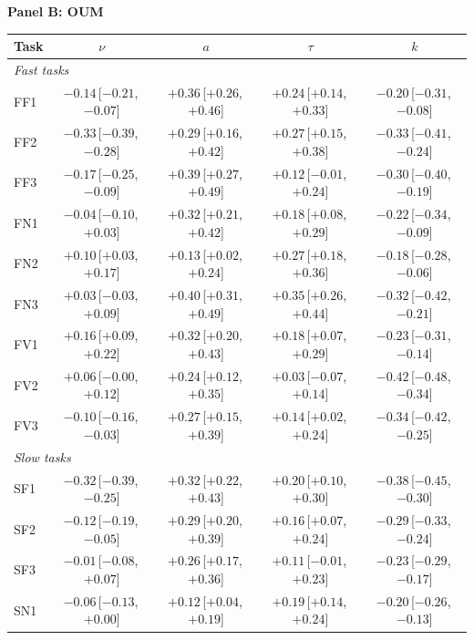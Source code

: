 \begin{table}[ht]
\medskip
\textbf{Panel B: OUM}\par\vspace{2pt}
\begin{tabular}{l cccc}
\toprule
Task & $\nu$ & $a$ & $\tau$ & $k$ \\
\midrule
\multicolumn{5}{l}{\textit{Fast tasks}} \\
FF1 & $-0.14$\,[$-0.21$,\,$-0.07$] & $+0.36$\,[$+0.26$,\,$+0.46$] & $+0.24$\,[$+0.14$,\,$+0.33$] & $-0.20$\,[$-0.31$,\,$-0.08$] \\
FF2 & $-0.33$\,[$-0.39$,\,$-0.28$] & $+0.29$\,[$+0.16$,\,$+0.42$] & $+0.27$\,[$+0.15$,\,$+0.38$] & $-0.33$\,[$-0.41$,\,$-0.24$] \\
FF3 & $-0.17$\,[$-0.25$,\,$-0.09$] & $+0.39$\,[$+0.27$,\,$+0.49$] & $+0.12$\,[$-0.01$,\,$+0.24$] & $-0.30$\,[$-0.40$,\,$-0.19$] \\
FN1 & $-0.04$\,[$-0.10$,\,$+0.03$] & $+0.32$\,[$+0.21$,\,$+0.42$] & $+0.18$\,[$+0.08$,\,$+0.29$] & $-0.22$\,[$-0.34$,\,$-0.09$] \\
FN2 & $+0.10$\,[$+0.03$,\,$+0.17$] & $+0.13$\,[$+0.02$,\,$+0.24$] & $+0.27$\,[$+0.18$,\,$+0.36$] & $-0.18$\,[$-0.28$,\,$-0.06$] \\
FN3 & $+0.03$\,[$-0.03$,\,$+0.09$] & $+0.40$\,[$+0.31$,\,$+0.49$] & $+0.35$\,[$+0.26$,\,$+0.44$] & $-0.32$\,[$-0.42$,\,$-0.21$] \\
FV1 & $+0.16$\,[$+0.09$,\,$+0.22$] & $+0.32$\,[$+0.20$,\,$+0.43$] & $+0.18$\,[$+0.07$,\,$+0.29$] & $-0.23$\,[$-0.31$,\,$-0.14$] \\
FV2 & $+0.06$\,[$-0.00$,\,$+0.12$] & $+0.24$\,[$+0.12$,\,$+0.35$] & $+0.03$\,[$-0.07$,\,$+0.14$] & $-0.42$\,[$-0.48$,\,$-0.34$] \\
FV3 & $-0.10$\,[$-0.16$,\,$-0.03$] & $+0.27$\,[$+0.15$,\,$+0.39$] & $+0.14$\,[$+0.02$,\,$+0.24$] & $-0.34$\,[$-0.42$,\,$-0.25$] \\
\multicolumn{5}{l}{\textit{Slow tasks}} \\
SF1 & $-0.32$\,[$-0.39$,\,$-0.25$] & $+0.32$\,[$+0.22$,\,$+0.43$] & $+0.20$\,[$+0.10$,\,$+0.30$] & $-0.38$\,[$-0.45$,\,$-0.30$] \\
SF2 & $-0.12$\,[$-0.19$,\,$-0.05$] & $+0.29$\,[$+0.20$,\,$+0.39$] & $+0.16$\,[$+0.07$,\,$+0.24$] & $-0.29$\,[$-0.33$,\,$-0.24$] \\
SF3 & $-0.01$\,[$-0.08$,\,$+0.07$] & $+0.26$\,[$+0.17$,\,$+0.36$] & $+0.11$\,[$-0.01$,\,$+0.23$] & $-0.23$\,[$-0.29$,\,$-0.17$] \\
SN1 & $-0.06$\,[$-0.13$,\,$+0.00$] & $+0.12$\,[$+0.04$,\,$+0.19$] & $+0.19$\,[$+0.14$,\,$+0.24$] & $-0.20$\,[$-0.26$,\,$-0.13$] \\

\end{tabular}
\end{table}
